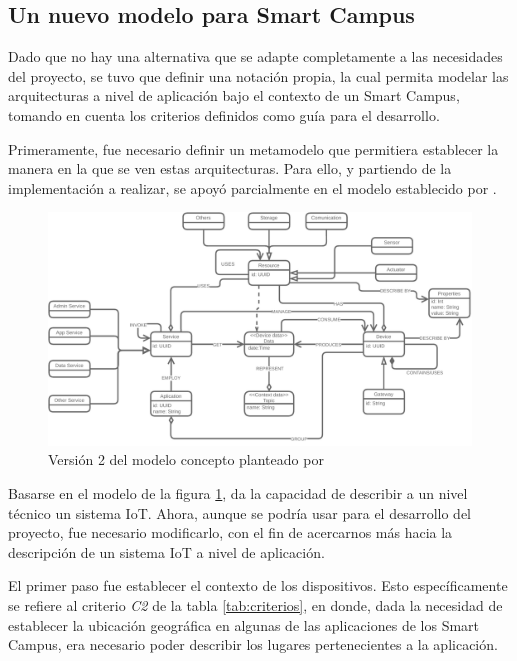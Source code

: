 \subsection{Un nuevo modelo para Smart Campus}

Dado que no hay una alternativa que se adapte completamente a las necesidades del proyecto, se tuvo que definir una notación propia, la cual permita modelar las arquitecturas a nivel de aplicación bajo el contexto de un Smart Campus, tomando en cuenta los criterios definidos como guía para el desarrollo.

Primeramente, fue necesario definir un metamodelo que permitiera establecer la manera en la que se ven estas arquitecturas. Para ello, y partiendo de la implementación a realizar, se apoyó parcialmente en el modelo establecido por . 

\begin{figure}[H]
    \centering
    \caption{Versión 2 del modelo concepto planteado por \protect\citeauthor{msc_henry_2022}}
    \label{fig:henrymodelo}
    \vspace{2mm}

    \includegraphics[width=\linewidth]{images/HenryModelo.pdf}
\end{figure}

Basarse en el modelo de la figura \ref{fig:henrymodelo}, da la capacidad de describir a un nivel técnico un sistema IoT. Ahora, aunque se podría usar para el desarrollo del proyecto, fue necesario modificarlo, con el fin de acercarnos más hacia la descripción de un sistema IoT a nivel de aplicación. 

El primer paso fue establecer el contexto de los dispositivos. Esto específicamente se refiere al criterio \textit{C2} de la tabla \ref{tab:criterios}, en donde, dada la necesidad de establecer la ubicación geográfica en algunas de las aplicaciones de los Smart Campus, era necesario poder describir los lugares pertenecientes a la aplicación.

